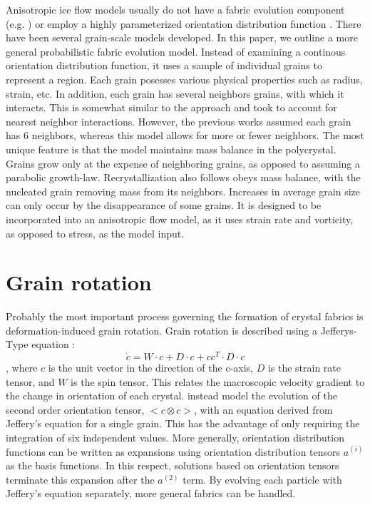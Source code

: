 \documentclass{article}
\begin{document}
Anisotropic ice flow models usually do not have a fabric evolution component (e.g. \citet{pettit2007}) or employ a highly parameterized orientation distribution function \citep{gillet2006}. There have been several grain-scale models developed. In this paper, we outline a more general probabilistic fabric evolution model. Instead of examining a continous orientation distribution function, it uses a sample of individual grains to represent a region. Each grain posesses various physical properties such as radius, strain, etc. In addition, each grain has several neighbors grains, with which it interacts. This is somewhat similar to the approach \citet{thorsteinsson2002nni} and \citet{kennedy} took to account for nearest neighbor interactions. However, the previous works assumed each grain has 6 neighbors, whereas this model allows for more or fewer neighbors. The most unique feature is that the model maintains mass balance in the polycrystal. Grains grow only at the expense of neighboring grains, as opposed to assuming a parabolic growth-law. Recrystallization also follows obeys mass balance, with the nucleated grain removing mass from its neighbors. Increases in average grain size can only occur by the disappearance of some grains. It is designed to be incorporated into an anisotropic flow model, as it uses strain rate and vorticity, as opposed to stress, as the model input. 

\section{Grain rotation}
Probably the most important process governing the formation of crystal fabrics is deformation-induced grain rotation. Grain rotation is described using a Jefferys-Type equation \citep{azuma94}:
\[
 \dot{c} = W \cdot c + D \cdot c + c c^T \cdot D \cdot c
\],
where $c$ is the unit vector in the direction of the c-axis, $D$ is the strain rate tensor, and $W$ is the spin tensor. This relates the macroscopic velocity gradient to the change in orientation of each crystal. \citet{gillet2005} instead model the evolution of the second order orientation tensor, $<c \otimes c >$, with an equation derived from Jeffery's equation for a single grain. This has the advantage of only requiring the integration of six independent values. More generally, orientation distribution functions can be written as expansions using orientation distribution tensors $a^{(i)}$ as the basis functions. In this respect, solutions based on orientation tensors terminate this expansion after the $a^{(2)}$ term. By evolving each particle with Jeffery's equation separately, more general fabrics can be handled. 
\end{document}
